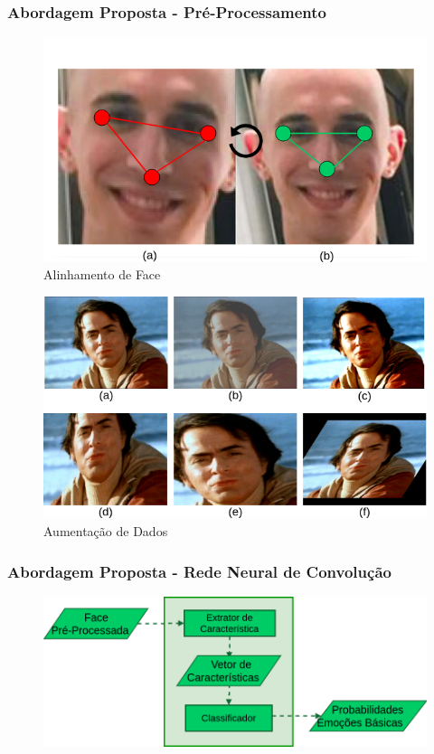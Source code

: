 \documentclass{beamer}
\begin{document}
\begin{frame}
\frametitle{Abordagem Proposta - Pré-Processamento}

\pause
\begin{figure}
\centering
\includegraphics[scale=0.23]{figuras/face_alinhada.png}
\caption{Alinhamento de Face}
\label{fig:face_alinhada}
\end{figure}

\pause 
\begin{figure}
\centering
\includegraphics[scale=0.23]{figuras/augmentation.png}
\caption{Aumentação de Dados}
\label{fig:augmentation}
\end{figure}
\end{frame}



\begin{frame}
\frametitle{Abordagem Proposta - Rede Neural de Convolução}
\begin{figure}
\centering
\includegraphics[scale=0.33]{figuras/abordagem_6.png}
\label{fig:arquitetura3}
\end{figure}
\end{frame}
\end{document}

